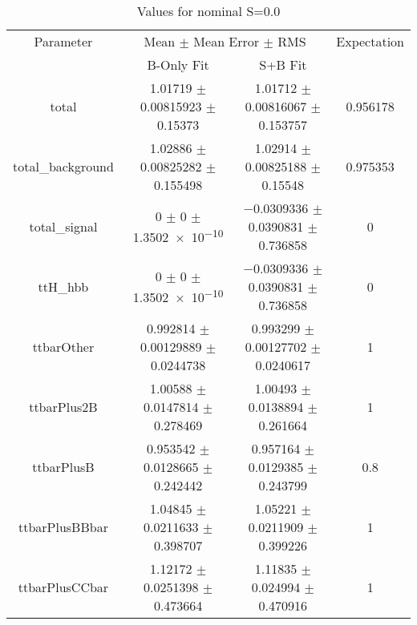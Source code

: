 \begin{table}
\centering
\caption{Values for nominal S=0.0}
\begin{tabular}{cccc}
\toprule
Parameter & \multicolumn{2}{c}{Mean $\pm$ Mean Error $\pm$ RMS} & Expectation\\
 & B-Only Fit & S+B Fit & \\
\midrule
total & \num{1.01719} $\pm$ \num{0.00815923} $\pm$ \num{0.15373} & \num{1.01712} $\pm$ \num{0.00816067} $\pm$ \num{0.153757} & \num{0.956178}\\
total\_background & \num{1.02886} $\pm$ \num{0.00825282} $\pm$ \num{0.155498} & \num{1.02914} $\pm$ \num{0.00825188} $\pm$ \num{0.15548} & \num{0.975353}\\
total\_signal & \num{0} $\pm$ \num{0} $\pm$ \num{1.3502e-10} & \num{-0.0309336} $\pm$ \num{0.0390831} $\pm$ \num{0.736858} & \num{0}\\
ttH\_hbb & \num{0} $\pm$ \num{0} $\pm$ \num{1.3502e-10} & \num{-0.0309336} $\pm$ \num{0.0390831} $\pm$ \num{0.736858} & \num{0}\\
ttbarOther & \num{0.992814} $\pm$ \num{0.00129889} $\pm$ \num{0.0244738} & \num{0.993299} $\pm$ \num{0.00127702} $\pm$ \num{0.0240617} & \num{1}\\
ttbarPlus2B & \num{1.00588} $\pm$ \num{0.0147814} $\pm$ \num{0.278469} & \num{1.00493} $\pm$ \num{0.0138894} $\pm$ \num{0.261664} & \num{1}\\
ttbarPlusB & \num{0.953542} $\pm$ \num{0.0128665} $\pm$ \num{0.242442} & \num{0.957164} $\pm$ \num{0.0129385} $\pm$ \num{0.243799} & \num{0.8}\\
ttbarPlusBBbar & \num{1.04845} $\pm$ \num{0.0211633} $\pm$ \num{0.398707} & \num{1.05221} $\pm$ \num{0.0211909} $\pm$ \num{0.399226} & \num{1}\\
ttbarPlusCCbar & \num{1.12172} $\pm$ \num{0.0251398} $\pm$ \num{0.473664} & \num{1.11835} $\pm$ \num{0.024994} $\pm$ \num{0.470916} & \num{1}\\
\bottomrule
\end{tabular}
\end{table}
